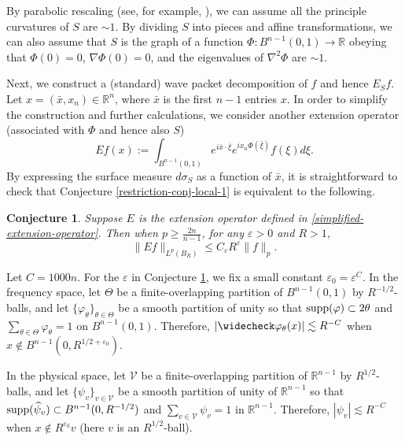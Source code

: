 \documentclass{amsart}
\numberwithin{equation}{section}
\newtheorem{conjecture}[theorem]{Conjecture}
\newcommand{\e}{\varepsilon}
\newcommand{\si}{\sigma}
\newcommand{\vp}{\varphi}
\newcommand{\wh}{\widehat}
\newcommand{\ZR}{\mathbb{R}}
\newcommand{\cv}{{\mathcal V}}
\newcommand{\supp}{{\rm supp}}
\begin{document}
By parabolic rescaling (see, for example, \cite{Guth-R3}), we can assume all the principle curvatures of $S$ are $\sim1$.
By dividing $S$ into pieces and affine transformations, we can also assume that $S$ is the graph of a function $\Phi:B^{n-1}(0,1)\to\ZR$ obeying that $\Phi(0)=0$, $\nabla\Phi(0)=0$, and the eigenvalues of $\nabla^2\Phi$ are $\sim1$. 


\smallskip


Next, we construct a (standard) wave packet decomposition of $f$ and hence $E_Sf$.
Let $x=(\bar x,x_n)\in\ZR^n$, where $\bar x$ is the first $n-1$ entries $x$. 
In order to simplify the construction and further calculations, we consider another extension operator (associated with $\Phi$ and hence also $S$)
\begin{equation}
\label{simplified-extension-operator}
    E f(x):=\int_{B^{n-1}(0,1)}e^{i\bar x\cdot \bar\xi}e^{ix_n\Phi(\bar\xi)}f(\xi)d\xi.
\end{equation}
By expressing the surface measure $d\si_S$ as a function of $\bar x$, it is straightforward to check that Conjecture \ref{restriction-conj-local-1} is equivalent to the following.
\begin{conjecture}
\label{restriction-conj-local-2}
Suppose $E$ is the extension operator defined in \eqref{simplified-extension-operator}. 
Then when $p\geq\frac{2n}{n-1}$, for any $\e>0$ and $R>1$,
\begin{equation}
\label{reduced-restriction-esti}
    \|E f\|_{L^p(B_R)}\leq C_\e R^\e \|f\|_{p}.
\end{equation}
\end{conjecture}

Let $C=1000n$. For the $\e$ in Conjecture \ref{restriction-conj-local-2}, we fix a small constant $\e_0=\e^{C}$. 
In the frequency space, let $\Theta$ be a finite-overlapping partition of $B^{n-1}(0,1)$ by $R^{-1/2}$-balls, and let $\{\vp_\theta\}_{\theta\in \Theta}$ be a smooth partition of unity so that $\supp(\vp)\subset 2\theta$ and $\sum_{\theta\in\Theta} \vp_\theta=1$ on $B^{n-1}(0,1)$. 
Therefore, $|\widecheck\vp_\theta(x)|\lesssim R^{-C}$ when $x\not \in B^{n-1}(0,R^{1/2+\e_0})$.

In the physical space, let $\cv$ be a finite-overlapping partition of $\ZR^{n-1}$ by $R^{1/2}$-balls, and let $\{\psi_v\}_{v\in \cv}$ be a smooth partition of unity of $\ZR^{n-1}$ so that $\supp(\wh\psi_v)\subset B^{n-1}(0,R^{-1/2})$ and $\sum_{v\in\cv}\psi_v=1$ in $\ZR^{n-1}$. 
Therefore, $|\psi_v|\lesssim R^{-C}$ when $x\not\in R^{\e_0}v$ (here $v$ is an $R^{1/2}$-ball).
\end{document}
